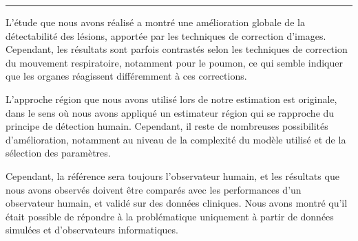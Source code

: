 


\rule{15cm}{0.1em}

\vspace{3cm}

L'étude que nous avons réalisé a montré une amélioration globale de la détectabilité des lésions, apportée par les techniques de correction d'images. Cependant, les résultats sont parfois contrastés selon les techniques de correction du mouvement respiratoire, notamment pour le poumon, ce qui semble indiquer que les organes réagissent différemment à ces corrections.

L'approche région que nous avons utilisé lors de notre estimation est originale, dans le sens où nous avons appliqué un estimateur région qui se rapproche du principe de détection humain. Cependant, il reste de nombreuses possibilités d'amélioration, notamment au niveau de la complexité du modèle utilisé et de la sélection des paramètres. 

Cependant, la référence sera toujours l'observateur humain, et les résultats que nous avons observés doivent être comparés avec les performances d'un observateur humain, et validé sur des données cliniques. Nous avons montré qu'il était possible de répondre à la problématique uniquement à partir de données simulées et d'observateurs informatiques.